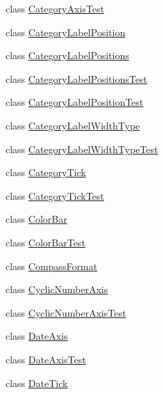 \begin{DoxyCompactItemize}
\item 
class \mbox{\hyperlink{classorg_1_1jfree_1_1chart_1_1axis_1_1_category_axis_test}{Category\+Axis\+Test}}
\item 
class \mbox{\hyperlink{classorg_1_1jfree_1_1chart_1_1axis_1_1_category_label_position}{Category\+Label\+Position}}
\item 
class \mbox{\hyperlink{classorg_1_1jfree_1_1chart_1_1axis_1_1_category_label_positions}{Category\+Label\+Positions}}
\item 
class \mbox{\hyperlink{classorg_1_1jfree_1_1chart_1_1axis_1_1_category_label_positions_test}{Category\+Label\+Positions\+Test}}
\item 
class \mbox{\hyperlink{classorg_1_1jfree_1_1chart_1_1axis_1_1_category_label_position_test}{Category\+Label\+Position\+Test}}
\item 
class \mbox{\hyperlink{classorg_1_1jfree_1_1chart_1_1axis_1_1_category_label_width_type}{Category\+Label\+Width\+Type}}
\item 
class \mbox{\hyperlink{classorg_1_1jfree_1_1chart_1_1axis_1_1_category_label_width_type_test}{Category\+Label\+Width\+Type\+Test}}
\item 
class \mbox{\hyperlink{classorg_1_1jfree_1_1chart_1_1axis_1_1_category_tick}{Category\+Tick}}
\item 
class \mbox{\hyperlink{classorg_1_1jfree_1_1chart_1_1axis_1_1_category_tick_test}{Category\+Tick\+Test}}
\item 
class \mbox{\hyperlink{classorg_1_1jfree_1_1chart_1_1axis_1_1_color_bar}{Color\+Bar}}
\item 
class \mbox{\hyperlink{classorg_1_1jfree_1_1chart_1_1axis_1_1_color_bar_test}{Color\+Bar\+Test}}
\item 
class \mbox{\hyperlink{classorg_1_1jfree_1_1chart_1_1axis_1_1_compass_format}{Compass\+Format}}
\item 
class \mbox{\hyperlink{classorg_1_1jfree_1_1chart_1_1axis_1_1_cyclic_number_axis}{Cyclic\+Number\+Axis}}
\item 
class \mbox{\hyperlink{classorg_1_1jfree_1_1chart_1_1axis_1_1_cyclic_number_axis_test}{Cyclic\+Number\+Axis\+Test}}
\item 
class \mbox{\hyperlink{classorg_1_1jfree_1_1chart_1_1axis_1_1_date_axis}{Date\+Axis}}
\item 
class \mbox{\hyperlink{classorg_1_1jfree_1_1chart_1_1axis_1_1_date_axis_test}{Date\+Axis\+Test}}
\item 
class \mbox{\hyperlink{classorg_1_1jfree_1_1chart_1_1axis_1_1_date_tick}{Date\+Tick}}

\end{DoxyCompactItemize}

